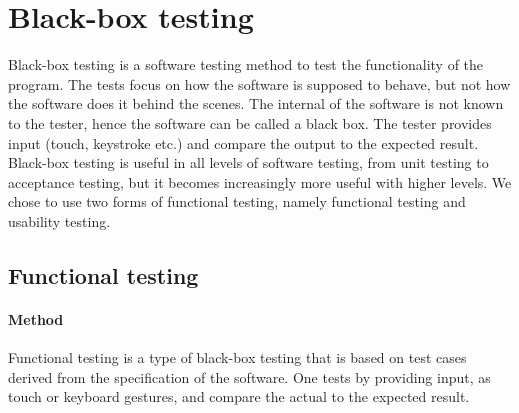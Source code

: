 
\section{Black-box testing}
		Black-box testing is a software testing method to test the functionality of the program. The tests focus on how the software is supposed to behave, but not how the software does it behind the scenes. The internal of the software is not known to the tester, hence the software can be called a black box. The tester provides input (touch, keystroke etc.) and compare the output to the expected result. Black-box testing is useful in all levels of software testing, from unit testing to acceptance testing, but it becomes increasingly more useful with higher levels. 
\newline
\newline
We chose to use two forms of functional testing, namely functional testing and usability testing. 
		\subsection{Functional testing}
			\paragraph{Method}
				Functional testing is a type of black-box testing that is based on test cases derived from the specification of the software. One tests by providing input, as touch or keyboard gestures, and compare the actual to the expected result. 
